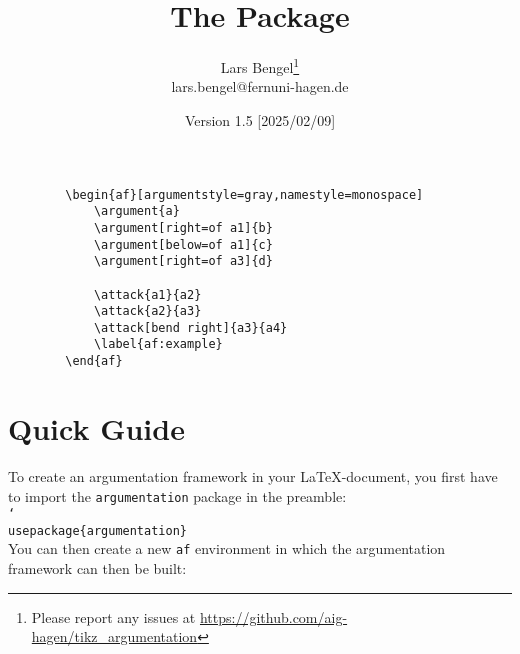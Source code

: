 \documentclass{scrartcl}
\title{The \argumentation Package}
\author{Lars Bengel\footnote{Please report any issues at \url{https://github.com/aig-hagen/tikz_argumentation}}\\\small lars.bengel@fernuni-hagen.de}
\date{Version 1.5 [2025/02/09]}
\newcommand{\argumentation}{\texttt{argumentation}\xspace}
\DeclareRobustCommand\cs[2][-1.6cm]{\hspace{#1}\texttt{\char`\\#2}}
\begin{document}
\maketitle

\begin{minipage}{.26\textwidth}
    \centering
        \begin{af}[argumentstyle=gray,namestyle=monospace]
    
            \label{af:example}
        \end{af}
\end{minipage}
\begin{minipage}{.5\textwidth}
    \begin{small}
    \begin{verbatim}
        \begin{af}[argumentstyle=gray,namestyle=monospace]
            \argument{a}
            \argument[right=of a1]{b}
            \argument[below=of a1]{c}
            \argument[right=of a3]{d}
    
            \attack{a1}{a2}
            \attack{a2}{a3}
            \attack[bend right]{a3}{a4}
            \label{af:example}
        \end{af}
    \end{verbatim}
    \end{small}
\end{minipage}


\tableofcontents
\newpage

\section{Quick Guide}\label{sec:quick}
\noindent
To create an argumentation framework in your \LaTeX-document, you first have to import the \argumentation package in the preamble:\\

\noindent\cs[0cm]{usepackage\{argumentation\}}\\

You can then create a new \texttt{af} environment in which the argumentation framework can then be built:\\
\end{document}

